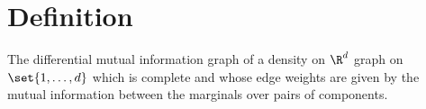 
\section*{Definition}

The differential mutual information graph of a density on $\R ^d$ graph on $\set{1, \dots , d}$ which is complete and whose edge weights are given by the mutual information between the marginals over pairs of components.

\blankpage